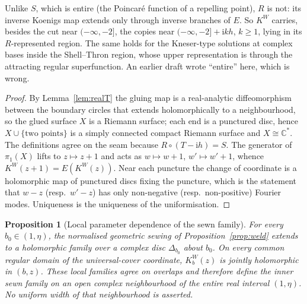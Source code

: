 \documentclass[11pt,a4paper]{article}
\newtheorem{proposition}[theorem]{Proposition}
\theoremstyle{definition}
\newcommand{\Rr}{R}
\newcommand{\Kk}{K}
\newcommand{\ii}{\mathrm{i}}
\begin{document}
\noindent
Unlike $S$, which is entire (the Poincar\'e function of a repelling point),
$\Rr$ is not: its inverse Koenigs map extends only through inverse branches of
$E$.  So $\Kk^W$ carries, besides the cut near $(-\infty,-2]$, the copies
near $(-\infty,-2]+\ii kh$, $k\ge1$, lying in its $\Rr$-represented region.
The same holds for the Kneser-type solutions at complex bases inside the
Shell--Thron region, whose upper representation is through the attracting
regular superfunction.  An earlier draft wrote ``entire'' here, which is
wrong.

\begin{proof}
By Lemma~\ref{lem:realT} the gluing map is a real-analytic diffeomorphism
between the boundary circles that extends holomorphically to a neighbourhood,
so the glued surface $X$ is a Riemann surface; each end is a punctured disc,
hence $X\cup\{\text{two points}\}$ is a simply connected compact Riemann
surface and $X\cong\mathbb C^*$.  The definitions agree on the seam because
$\Rr\circ(T-\ii h)=S$.  The generator of $\pi_1(X)$ lifts to $z\mapsto z+1$
and acts as $w\mapsto w+1$, $w'\mapsto w'+1$, whence
$\Kk^W(z+1)=E(\Kk^W(z))$.  Near each puncture the change of coordinate is a
holomorphic map of punctured discs fixing the puncture, which is the
statement that $w-z$ (resp.\ $w'-z$) has only non-negative (resp.\
non-positive) Fourier modes.  Uniqueness is the uniqueness of the uniformisation.
\end{proof}

\begin{proposition}[Local parameter dependence of the sewn family]
\label{prop:weld-parameter}
For every $b_0\in(1,\eta)$, the normalised geometric sewing of
Proposition~\ref{prop:weld} extends to a holomorphic family over a complex
disc $\Delta_{b_0}$ about $b_0$.  On every common regular domain of the
universal-cover coordinate, $\Kk_b^W(z)$ is jointly holomorphic in $(b,z)$.
These local families agree on overlaps and therefore define the inner sewn
family on an open complex neighbourhood of the entire real interval
$(1,\eta)$.  No uniform width of that neighbourhood is asserted.
\end{proposition}
\end{document}
